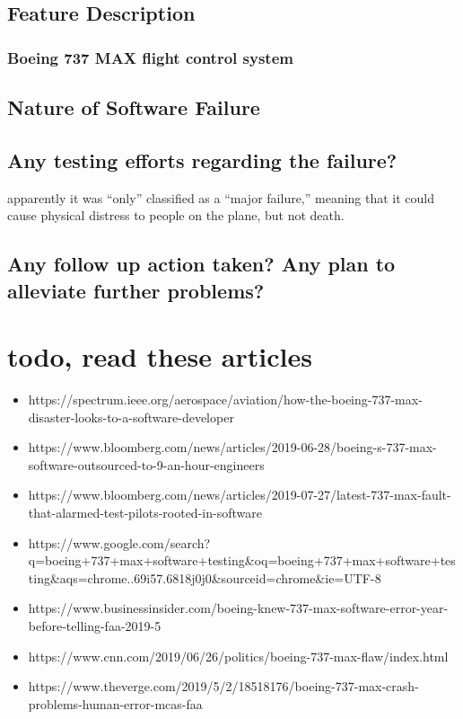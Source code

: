 \documentclass[letterpaper]{article}
\begin{document}
	\subsection*{Feature Description}

	\subsubsection*{Boeing 737 MAX flight control system}

	\subsection*{Nature of Software Failure}

	\subsection*{Any testing efforts regarding the failure?}
	apparently it was ``only'' classified as a “major failure,” meaning that it could cause physical distress to people on the plane, but not death. \cite{gates_2019}

	\subsection*{Any follow up action taken? Any plan to alleviate further problems?}

	\section{todo, read these articles}
	\begin{itemize}
		\item https://spectrum.ieee.org/aerospace/aviation/how-the-boeing-737-max-disaster-looks-to-a-software-developer
		\item https://www.bloomberg.com/news/articles/2019-06-28/boeing-s-737-max-software-outsourced-to-9-an-hour-engineers
		\item https://www.bloomberg.com/news/articles/2019-07-27/latest-737-max-fault-that-alarmed-test-pilots-rooted-in-software
		\item https://www.google.com/search?q=boeing+737+max+software+testing&oq=boeing+737+max+software+testing&aqs=chrome..69i57.6818j0j0&sourceid=chrome&ie=UTF-8
		\item https://www.businessinsider.com/boeing-knew-737-max-software-error-year-before-telling-faa-2019-5
		\item https://www.cnn.com/2019/06/26/politics/boeing-737-max-flaw/index.html
		\item https://www.theverge.com/2019/5/2/18518176/boeing-737-max-crash-problems-human-error-mcas-faa
	\end{itemize}
\nocite{*}
\printbibliography
\end{document}
